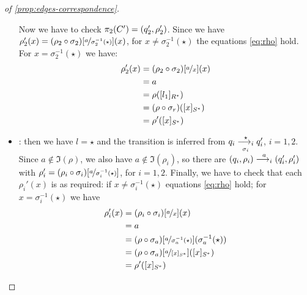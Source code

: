 \begin{proof}[of \cref{prop:edges-correspondence}]
\begin{itemize}
\begin{itemize}
	\end{itemize}
	Now we have to check $\pi_2(C') = (q_2',\rho_2')$. Since we have $\rho'_2(x) = (\rho_2 \circ \sigma_2)[\nicefrac{a}{\sigma_2^{-1}(\star)}](x)$, for $x \neq \sigma_2^{-1}(\star)$ the equations \eqref{eq:rho} hold. For $x =  \sigma_2^{-1}(\star)$ we have:
	\begin{align*}
		\rho'_2(x) &= (\rho_2 \circ \sigma_2)[\nicefrac{a}{x}](x) \\
		&= a \\
		&= \rho([l_1]_{R^*}) \\
		&= (\rho \circ \sigma_r)([x]_{S^*}) \\
		& = \rho'([x]_{S^*})
	\end{align*}	


	\item \allrule: then we have $l=\star$ and the transition is inferred from $q_i \overset{\star}{\underset{\sigma_i}{\longrightarrow_{i}}} q_i'$, $i=1,2$. Since $a \notin \Im(\rho)$, we also have $a \notin \Im(\rho_i)$, so there are $(q_i,\rho_i) \overset{a}{\longrightarrow_{i}} (q_i',\rho_i')$ with $\rho_i' = (\rho_i \circ \sigma_i)[\nicefrac{a}{\sigma^{-1}_i(\star)}]$, for $i=1,2$. Finally, we have to check that each $\rho_i'(x)$ is as required: if $x \neq\sigma_i^{-1}(\star)$ equations \eqref{eq:rho} hold; for $x=\sigma_i^{-1}(\star)$ we have
	\begin{align*}
		\rho'_i(x) &= (\rho_i \circ \sigma_i)[\nicefrac{a}{x}](x) \\
		&= a \\
		&= (\rho \circ \sigma_a) [\nicefrac{a}{\sigma_a^{-1}(\star)}](\sigma_a^{-1}(\star)) \\
		&= (\rho \circ \sigma_a) [\nicefrac{a}{[x]_{S^*}}]([x]_{S^*}) \\
		&= \rho'([x]_{S^*})
	\end{align*}
	
\end{itemize} 



\end{proof}

